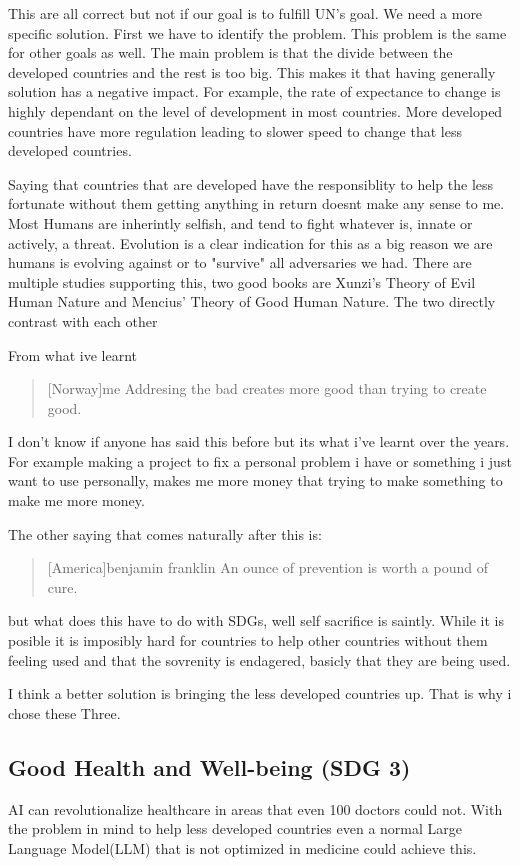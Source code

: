 This are all correct but not if our goal is to fulfill UN's goal. We need a more specific solution. First we have to identify the problem. This problem is the same for other goals as well. The main problem is that the divide between the developed countries and the rest is too big. This makes it that having generally solution has a negative impact. For example, the rate of expectance to change is highly dependant on the level of development in most countries. More developed countries have more regulation leading to slower speed to change that less developed countries.

Saying that countries that are developed have the responsiblity to help the less fortunate without them getting anything in return doesnt make any sense to me. Most Humans are inherintly selfish, and tend to fight whatever is, innate or actively, a threat. Evolution is a clear indication for this as a big reason we are humans is evolving against or to "survive" all adversaries we had. There are multiple studies supporting this, two good books are  Xunzi's Theory of Evil Human Nature and Mencius' Theory of Good Human Nature. The two directly contrast with each other 

From what ive learnt
\begin{quote}[Norway]{me}
    Addresing the bad creates more good than trying to create good.
\end{quote}

I don't know if anyone has said this before but its what i've learnt over the years. For example making a project to fix a personal problem i have or something i just want to use personally, makes me more money that trying to make something to make me more money.

The other saying that comes naturally after this is: 

\begin{quote}[America]{benjamin franklin\cite{Benjamin_Franklin}}
    An ounce of prevention is worth a pound of cure.
\end{quote}

but what does this have to do with SDGs, well self sacrifice is saintly. While it is posible it is imposibly hard for countries to help other countries without them feeling used and that the sovrenity is endagered, basicly that they are being used.

I think a better solution is bringing the less developed countries up. That is why i chose these Three.

\subsection{Good Health and Well-being (SDG 3)}
AI can revolutionalize healthcare in areas that even 100 doctors could not. With the problem in mind to help less developed countries even a normal Large Language Model(LLM) that is not optimized in medicine could achieve this. 


